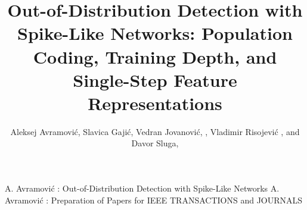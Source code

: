 \documentclass{ieeeaccess}
\begin{document}

\title{Out-of-Distribution Detection with Spike-Like Networks: Population Coding, Training Depth, and Single-Step Feature Representations}
\author{Aleksej Avramovi\'{c},
Slavica Gaji\'{c}, Vedran Jovanovi\'{c},
, Vladimir Risojevi\'{c}  , and Davor Sluga,}

\address[1]{HTEC Group, Banja Luka, Bosnia and Herzegovina}
\address[2]{Faculty of Electrical Engineering, University of Banja Luka, Bosnia and Herzegovina}
\address[3]{Faculty of Computer and Information Science, University of Ljubljana, Slovenia}

\markboth
{A. Avramovi\'{c} \headeretal: Out-of-Distribution Detection with Spike-Like Networks}
{A. Avramovi\'{c} \headeretal: Preparation of Papers for IEEE TRANSACTIONS and JOURNALS}

\end{document}
